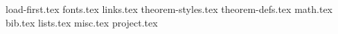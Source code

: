 
{load-first.tex}
{fonts.tex}
{links.tex}
{theorem-styles.tex}
{theorem-defs.tex}
{math.tex}
{bib.tex}
{lists.tex}
{misc.tex}
{project.tex}
